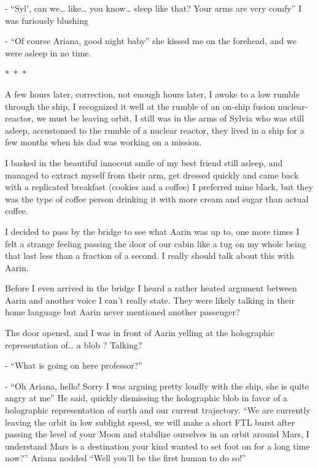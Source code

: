 \documentclass[hidelinks,12pt,a4paper]{book}
\newcommand\sep{\begin{center}
  \boldmath $\ast$~$\ast$~$\ast$
\end{center}}
\begin{document}
- “Syl', can we… like… you know… sleep like that? Your arms are very comfy” I was furiously blushing\par
\bigskip
- “Of course Ariana, good night baby” she kissed me on the forehead, and we were asleep in no time.

\sep

A few hours later, correction, not enough hours later, I awoke to a low rumble through the ship, 
I recognized it well at the rumble of an on-ship fusion nuclear-reactor, we must be leaving orbit, 
I still was in the arms of Sylvia who was still asleep, accustomed to the rumble of a nuclear reactor, 
they lived in a ship for a few months when his dad was working on a mission.\par
\bigskip

I basked in the beautiful innocent smile of my best friend still asleep, and managed to extract myself 
from their arm, get dressed quickly and came back with a replicated breakfast (cookies and a coffee) I preferred mine 
black, but they was the type of coffee person drinking it with more cream and sugar than actual coffee.\par
\bigskip

I decided to pass by the bridge to see what Aarin was up to, one more times I felt a strange feeling passing 
the door of our cabin like a tug on my whole being that last less than a fraction of a second. 
I really should talk about this with Aarin. \par
\bigskip

Before I even arrived in the bridge I heard a rather heated argument between Aarin and another voice I can't really state. 
They were likely talking in their home language but Aarin never mentioned another passenger?\par
\bigskip

The door opened, and I was in front of Aarin yelling at the holographic representation of… a blob ? Talking?\par
\bigskip

- “What is going on here professor?”\par
\bigskip
- “Oh Ariana, hello! Sorry I was arguing pretty loudly with the ship, she is quite angry at me” He said, 
quickly dismissing the holographic blob in favor of a holographic representation of earth and our current trajectory. 
“We are currently leaving the orbit in low sublight speed, we will make a short FTL burst after passing the level of 
your Moon and stabilize ourselves in an orbit around Mars, I understand Mars is a destination your kind wanted 
to set foot on for a long time now?” Ariana nodded “Well you'll be the first human to do so!”\par
\bigskip
\end{document}
